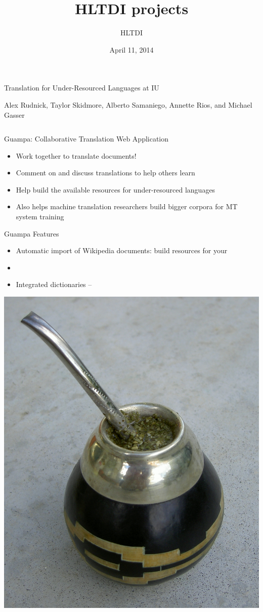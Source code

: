 \documentclass[final]{beamer}
\title{HLTDI projects}
\author{HLTDI}
\institute[Indiana University]{School of Informatics and Computing, Indiana University}
\date{April 11, 2014}
\begin{document}
\begin{frame}{} 
  \begin{block}
    {\centering \veryHuge Translation for Under-Resourced Languages at IU}\par
    \centering
    {\large Alex Rudnick, Taylor Skidmore, Alberto Samaniego, Annette Rios, and Michael Gasser}
    \par
  \end{block}

\begin{columns}[t]

  \begin{column}{.33\linewidth}

  \vfill
  \begin{block}{\large Guampa: Collaborative Translation Web Application}
    \centering
    \begin{itemize}
    \item Work together to translate documents!
    \item Comment on and discuss translations to help others learn
    \item Help build the available resources for under-resourced languages
    \item Also helps machine translation researchers build bigger corpora for
    MT system training
    \end{itemize}
  \end{block}

  \begin{block}{\large Guampa Features}
    \centering
    \begin{itemize}
    \item Automatic import of Wikipedia documents: build resources for your 
    \item 
    \item Integrated dictionaries -- 
    \end{itemize}
  \end{block}
  \centering

  \centering
  \includegraphics[width=.5\linewidth]{guampa_mate.jpg}
  \end{column}


\end{columns}
\end{frame}
\end{document}

